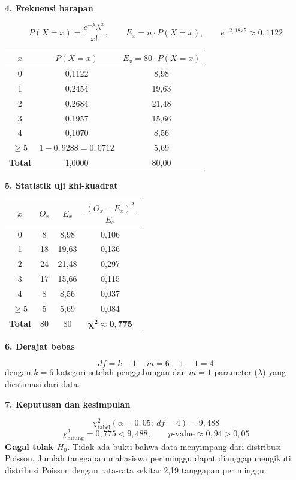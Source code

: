 \documentclass[11pt,a4paper]{article}
\newcommand{\soal}[1]{\par\Needspace{6\baselineskip}\medskip\textbf{#1}\par}
\newcommand{\chisq}{\chi^2}
\begin{document}
\soal{4. Frekuensi harapan}
\[
P(X = x) = \frac{e^{-\lambda}\lambda^{x}}{x!}, \qquad E_x = n \cdot P(X = x), \qquad e^{-2{,}1875} \approx 0{,}1122
\]
\begin{center}
\begin{tabular}{ccc}
\toprule
$x$ & $P(X = x)$ & $E_x = 80 \cdot P(X=x)$ \\
\midrule
0 & 0,1122 & 8,98 \\
1 & 0,2454 & 19,63 \\
2 & 0,2684 & 21,48 \\
3 & 0,1957 & 15,66 \\
4 & 0,1070 & 8,56 \\
$\geq 5$ & $1 - 0{,}9288 = 0{,}0712$ & 5,69 \\
\midrule
\textbf{Total} & 1,0000 & 80,00 \\
\bottomrule
\end{tabular}
\end{center}

\soal{5. Statistik uji khi-kuadrat}
\begin{center}
\begin{tabular}{cccc}
\toprule
$x$ & $O_x$ & $E_x$ & $\dfrac{(O_x-E_x)^2}{E_x}$ \\
\midrule
0 & 8 & 8,98 & 0,106 \\
1 & 18 & 19,63 & 0,136 \\
2 & 24 & 21,48 & 0,297 \\
3 & 17 & 15,66 & 0,115 \\
4 & 8 & 8,56 & 0,037 \\
$\geq 5$ & 5 & 5,69 & 0,084 \\
\midrule
\textbf{Total} & 80 & 80 & $\boldsymbol{\chisq \approx 0{,}775}$ \\
\bottomrule
\end{tabular}
\end{center}

\soal{6. Derajat bebas}
\[
df = k - 1 - m = 6 - 1 - 1 = 4
\]
dengan $k = 6$ kategori setelah penggabungan dan $m = 1$ parameter ($\lambda$) yang diestimasi dari data.

\soal{7. Keputusan dan kesimpulan}
\[
\chisq_{\text{tabel}}(\alpha = 0{,}05;\ df = 4) = 9{,}488
\]
\[
\chisq_{\text{hitung}} = 0{,}775 < 9{,}488, \qquad p\text{-value} \approx 0{,}94 > 0{,}05
\]
\textbf{Gagal tolak $H_0$.} Tidak ada bukti bahwa data menyimpang dari distribusi Poisson. Jumlah tanggapan mahasiswa per minggu dapat dianggap mengikuti distribusi Poisson dengan rata-rata sekitar 2,19 tanggapan per minggu.
\end{document}
